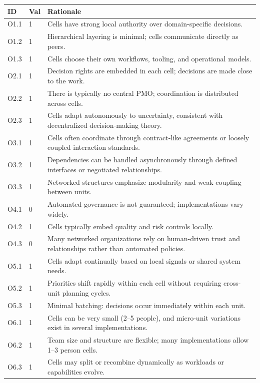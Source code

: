 \documentclass[11pt, a4paper, twocolumn]{article} %
\begin{document}
\begin{table}[h]
\centering
\begingroup\small
\setlength{\tabcolsep}{4pt}%
\begin{tabularx}{\linewidth}{llX}
\toprule
\textbf{ID} & \textbf{Val} & \textbf{Rationale} \\
\midrule
O1.1 & 1 &
Cells have strong local authority over domain-specific decisions. \\
O1.2 & 1 &
Hierarchical layering is minimal; cells communicate directly as peers. \\
O1.3 & 1 &
Cells choose their own workflows, tooling, and operational models. \\
\midrule
O2.1 & 1 &
Decision rights are embedded in each cell; decisions are made close to the work. \\
O2.2 & 1 &
There is typically no central PMO; coordination is distributed across cells. \\
O2.3 & 1 &
Cells adapt autonomously to uncertainty, consistent with decentralized decision-making theory. \\
\midrule
O3.1 & 1 &
Cells often coordinate through contract-like agreements or loosely coupled interaction standards. \\
O3.2 & 1 &
Dependencies can be handled asynchronously through defined interfaces or negotiated relationships. \\
O3.3 & 1 &
Networked structures emphasize modularity and weak coupling between units. \\
\midrule
O4.1 & 0 &
Automated governance is not guaranteed; implementations vary widely. \\
O4.2 & 1 &
Cells typically embed quality and risk controls locally. \\
O4.3 & 0 &
Many networked organizations rely on human-driven trust and relationships rather than automated policies. \\
\midrule
O5.1 & 1 &
Cells adapt continually based on local signals or shared system needs. \\
O5.2 & 1 &
Priorities shift rapidly within each cell without requiring cross-unit planning cycles. \\
O5.3 & 1 &
Minimal batching: decisions occur immediately within each unit. \\
\midrule
O6.1 & 1 &
Cells can be very small (2--5 people), and micro-unit variations exist in several implementations. \\
O6.2 & 1 &
Team size and structure are flexible; many implementations allow 1--3 person cells. \\
O6.3 & 1 &
Cells may split or recombine dynamically as workloads or capabilities evolve. \\
\bottomrule
\end{tabularx}
\endgroup
\end{table}
\end{document}
